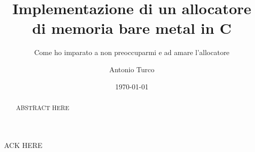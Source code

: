 \documentclass[noexaminfo,oneside,binding=0.6cm]{sapthesis}
\title{Implementazione di un allocatore di memoria bare metal in C}
\subtitle{Come ho imparato a non preoccuparmi e ad amare l'allocatore}
\author{Antonio Turco}
\date{\today}
\begin{document}
\frontmatter  
\maketitle
\dedication{Dedicato a chi rimane curioso per tutta la vita}

\begin{abstract}
  ABSTRACT HERE
\end{abstract}


\mainmatter 
\tableofcontents













\backmatter

\begin{acknowledgments}
  ACK HERE 
\end{acknowledgments}
\end{document}
